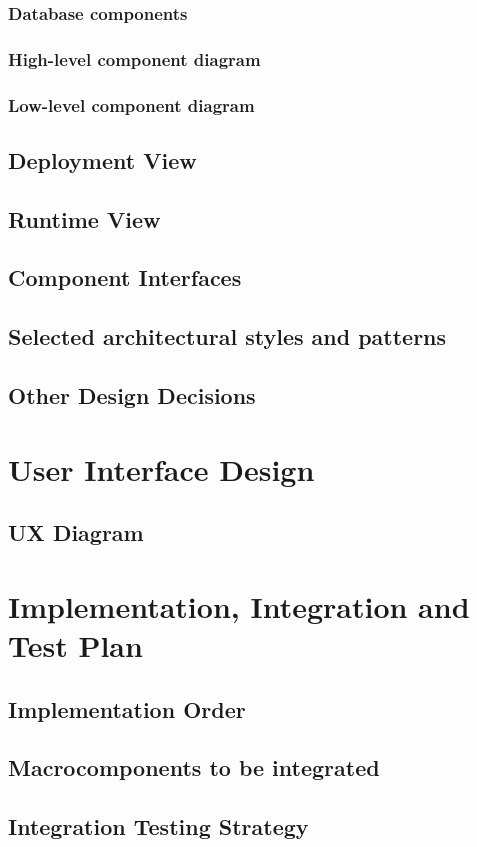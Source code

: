 \documentclass[12pt]{article}
\begin{document}
\subsubsection{Database components}\label{databasecomponent}

\subsubsection{High-level component diagram}

\subsubsection{Low-level component diagram}


\subsection{Deployment View}\label{deploymentview}

\subsection{Runtime View}\label{runtimeview}

\subsection{Component Interfaces}\label{componentinterfaces}

\subsection{Selected architectural styles and patterns}\label{archstyles}

\subsection{Other Design Decisions}\label{otherdecisions}

\clearpage
\section{User Interface Design}
\subsection{UX Diagram}

\clearpage
\section{Implementation, Integration and Test Plan}
\subsection{Implementation Order}

\subsection{Macrocomponents to be integrated}
\subsection{Integration Testing Strategy}

\end{document}
